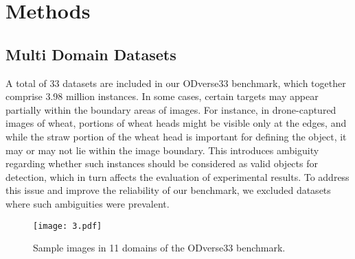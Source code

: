 \documentclass[runningheads]{llncs}
\begin{document}
\section{Methods}

\subsection{Multi Domain Datasets}
A total of 33 datasets are included in our ODverse33 benchmark, which together comprise 3.98 million instances. In some cases, certain targets may appear partially within the boundary areas of images. For instance, in drone-captured images of wheat, portions of wheat heads might be visible only at the edges, and while the straw portion of the wheat head is important for defining the object, it may or may not lie within the image boundary. This introduces ambiguity regarding whether such instances should be considered as valid objects for detection, which in turn affects the evaluation of experimental results. To address this issue and improve the reliability of our benchmark, we excluded datasets where such ambiguities were prevalent.


\begin{figure}[H]
\centering
\texttt{[image: 3.pdf]} %
\caption{Sample images in 11 domains of the ODverse33 benchmark.}
\label{fig:sample}
\end{figure}
\end{document}
